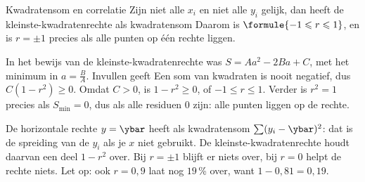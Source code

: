\begin{theorie}
\begin{stelling}{Kwadratensom en correlatie}
Zijn niet alle $x_i$ en niet alle $y_i$ gelijk, dan heeft de kleinste-kwadratenrechte als kwadratensom
Daarom is $\formule{-1 \leqslant r \leqslant 1}$, en is $r = \pm 1$ precies als alle punten op één rechte liggen.
\end{stelling}

\begin{bewijs}
In het bewijs van de kleinste-kwadratenrechte was $S = Aa^2 - 2Ba + C$, met het minimum in $a = \frac{B}{A}$. Invullen geeft
Een som van kwadraten is nooit negatief, dus $C(1 - r^2) \geqslant 0$. Omdat $C > 0$, is $1 - r^2 \geqslant 0$, of $-1 \leqslant r \leqslant 1$. Verder is $r^2 = 1$ precies als $S_{\min} = 0$, dus als alle residuen $0$ zijn: alle punten liggen op de rechte.
\end{bewijs}
\end{theorie}

De horizontale rechte $y = \ybar$ heeft als kwadratensom $\sum (y_i - \ybar)^2$: dat is de spreiding van de $y_i$ als je $x$ niet gebruikt. De kleinste-kwadratenrechte houdt daarvan een deel $1 - r^2$ over. Bij $r = \pm 1$ blijft er niets over, bij $r = 0$ helpt de rechte niets. Let op: ook $r = 0{,}9$ laat nog $19$\,\% over, want $1 - 0{,}81 = 0{,}19$.


